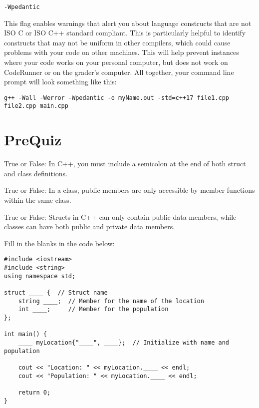 \texttt{-Wpedantic}

This flag enables warnings that alert you about language constructs that are not ISO C or ISO C++ standard compliant. This is particularly helpful to identify constructs that may not be uniform in other compilers, which could cause problems with your code on other machines. This will help prevent instances where your code works on your personal computer, but does not work on CodeRunner or on the grader's computer. All together, your command line prompt will look something like this:

\texttt{g++ -Wall -Werror -Wpedantic -o myName.out -std=c++17 file1.cpp file2.cpp main.cpp}


\section{PreQuiz}
\begin{problem}
True or False: In C++, you must include a semicolon at the end of both struct and class definitions.
\end{problem}

\begin{problem}
True or False: In a class, public members are only accessible by member functions within the same class.
\end{problem}

\begin{problem}
True or False: Structs in C++ can only contain public data members, while classes can have both public and private data members.
\end{problem}

\begin{problem}
Fill in the blanks in the code below:
\begin{verbatim}
#include <iostream>
#include <string>
using namespace std;

struct ____ {  // Struct name
    string ____;  // Member for the name of the location
    int ____;     // Member for the population
};

int main() {
    ____ myLocation{"____", ____};  // Initialize with name and population

    cout << "Location: " << myLocation.____ << endl;
    cout << "Population: " << myLocation.____ << endl;

    return 0;
}
\end{verbatim}
    
\end{problem}

